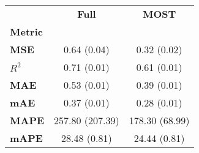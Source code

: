 \centering\begin{tabular}{l|cc}
\toprule
{} &    \textbf{Full} &   \textbf{MOST} \\
\textbf{Metric} &                  &                 \\
\midrule
\textbf{MSE   } &  0.64 (0.04) &  0.32 (0.02) \\
\textbf{$R^2$ } &  0.71 (0.01) &  0.61 (0.01) \\
\textbf{MAE   } &  0.53 (0.01) &  0.39 (0.01) \\
\textbf{mAE   } &  0.37 (0.01) &  0.28 (0.01) \\
\textbf{MAPE  } &  257.80 (207.39) &  178.30 (68.99) \\
\textbf{mAPE  } &  28.48 (0.81) &  24.44 (0.81) \\
\bottomrule
\end{tabular}
